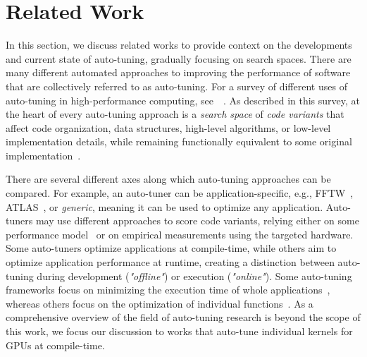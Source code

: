\section{Related Work}\label{sec:related_work}

In this section, we discuss related works to provide context on the developments and current state of auto-tuning, gradually focusing on search spaces. 
There are many different automated approaches to improving the performance of software that are collectively referred to as auto-tuning. For a survey of different uses of auto-tuning in high-performance computing, see~\citeauthor{balaprakash2017autotuning}~\cite{balaprakash2017autotuning}. 
As described in this survey, at the heart of every auto-tuning approach is a {\em search space} of {\em code variants} that affect code organization, data structures, high-level algorithms, or low-level implementation details, while remaining functionally equivalent to some original implementation~\cite{balaprakash2017autotuning}.

There are several different axes along which auto-tuning approaches can be compared. For example, an auto-tuner can be application-specific, e.g., FFTW~\cite{fftw1998}, ATLAS~\cite{atlas2001}, or {\em generic}, meaning it can be used to optimize any application. 
Auto-tuners may use different approaches to score code variants, relying either on some performance model~\cite{pruning} or on empirical measurements using the targeted hardware.
Some auto-tuners optimize applications at compile-time, while others aim to optimize application performance at runtime, creating a distinction between auto-tuning during development (\textit{"offline"}) or execution (\textit{"online"}).
Some auto-tuning frameworks focus on minimizing the execution time of whole applications~\cite{liuGPTuneMultitaskLearning2021,ytopt,nardiHyperMapperPracticalDesign2019,OpenTuner}, whereas others focus on the optimization of individual functions~\cite{KTT, ATF, vanwerkhovenKernelTunerSearchoptimizing2019}. 
As a comprehensive overview of the field of auto-tuning research is beyond the scope of this work, we focus our discussion to works that auto-tune individual kernels for GPUs at compile-time.

